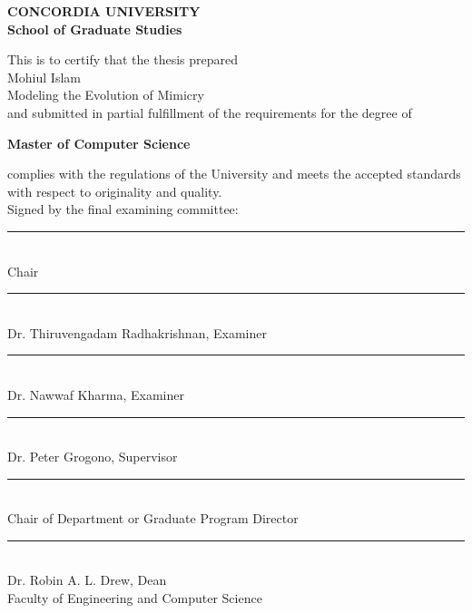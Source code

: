 \begin{titlepage}
\begin{center}
\Large \textbf{CONCORDIA UNIVERSITY}\\
\Large \textbf{School of Graduate Studies}\\[1cm]
\end{center}
This is to certify that the thesis prepared\\
 Mohiul Islam\\
  Modeling the Evolution of Mimicry\\
and submitted in partial fulfillment of the requirements for the degree of
\begin{center}
\small \textbf{Master of Computer Science}\\
\end{center}
complies with the regulations of the University and meets the accepted standards with respect to originality and quality.\\[0.4cm]
Signed by the final examining committee:\\[0.6cm]
\makebox[5cm][l]{} \rule{8cm}{0.1mm}\\ 
\makebox[5cm][l]{} Chair\\[0.6cm]
\makebox[5cm][l]{} \rule{8cm}{0.1mm}\\ 
\makebox[5cm][l]{} Dr. Thiruvengadam Radhakrishnan, Examiner\\[0.6cm]
\makebox[5cm][l]{} \rule{8cm}{0.1mm}\\ 
\makebox[5cm][l]{} Dr. Nawwaf Kharma, Examiner\\[0.6cm]
\makebox[5cm][l]{} \rule{8cm}{0.1mm}\\ 
\makebox[5cm][l]{} Dr. Peter Grogono, Supervisor\\[0.6cm]
 \rule{10cm}{0.1mm}\\ 
\makebox[5cm][l]{} Chair of Department or Graduate Program Director\\[0.6cm]
\makebox[5cm][l]{\rule{4cm}{0.1mm}} \rule{10cm}{0.1mm}\\ 
\makebox[5cm][l]{} Dr. Robin A. L. Drew, Dean \\
\makebox[5cm][l]{} Faculty of Engineering and Computer Science

\end{titlepage}